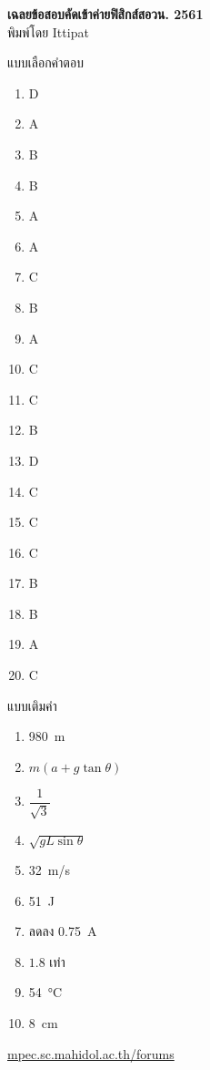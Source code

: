 \documentclass[a4paper,12pt]{article}
\begin{document}
	\thispagestyle{empty}
	\begin{center}
		{\huge \textbf{เฉลยข้อสอบคัดเข้าค่ายฟิสิกส์สอวน. 2561}}\\
		พิมพ์โดย Ittipat\\
	\end{center}
	\begin{multicols}{2}
		แบบเลือกคำตอบ
		\begin{enumerate}
			\item D
			\item A
			\item B
			\item B
			\item A
			\item A
			\item C
			\item B
			\item A
			\item C
			\item C
			\item B
			\item D
			\item C
			\item C
			\item C
			\item B
			\item B
			\item A
			\item C
		\end{enumerate}
		\columnbreak
		แบบเติมคำ
		\begin{enumerate}
			\item \SI{980}{m}
			\item \(m(a+g\tan\theta)\)
			\item \(\dfrac{1}{\sqrt{3}}\)
			\item \(\sqrt{gL\sin\theta}\)
			\item \SI{32}{m/s}
			\item \SI{51}{J}
			\item ลดลง \SI{0.75}{A}
			\item \(1.8\) เท่า
			\item \SI{54}{\celsius}
			\item \SI{8}{cm}
		\end{enumerate}
	\vspace*{\fill}\null
	\end{multicols}
	\vfill
	\begin{center}
		\href{http://mpec.sc.mahidol.ac.th/forums/}{mpec.sc.mahidol.ac.th/forums}
	\end{center}
\end{document}

